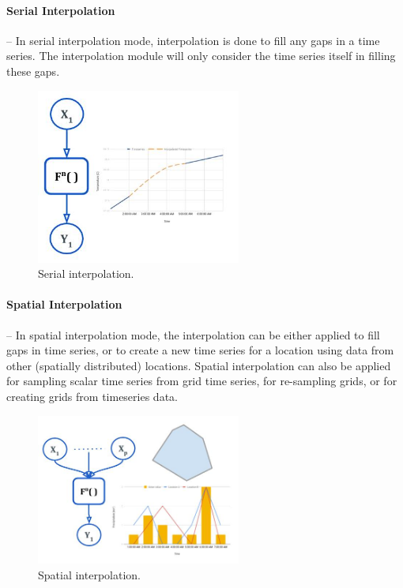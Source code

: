 \paragraph{Serial Interpolation}-- In serial interpolation mode, interpolation is done to fill any gaps in a time series. The interpolation module will only consider the time series itself in filling these gaps.
\begin{figure}[htp]
    \centering
    \includegraphics[width=0.6\textwidth]{method/data_preprocess/serial_interpolation.jpg}
    \caption{Serial interpolation.}
    \label{fi:serial_interpolation}
\end{figure}

\paragraph{Spatial Interpolation}-- In spatial interpolation mode, the interpolation can be either applied to fill gaps in time series, or to create a new time series for a location using data from other (spatially distributed) locations. Spatial interpolation can also be applied for sampling scalar time series from grid time series, for re-sampling grids, or for creating grids from timeseries data.
\begin{figure}[htp]
    \centering
    \includegraphics[width=0.6\textwidth]{method/data_preprocess/spatial_interpolation.jpg}
    \caption{Spatial interpolation.}
    \label{fi:spatial_interpolation}
\end{figure}

